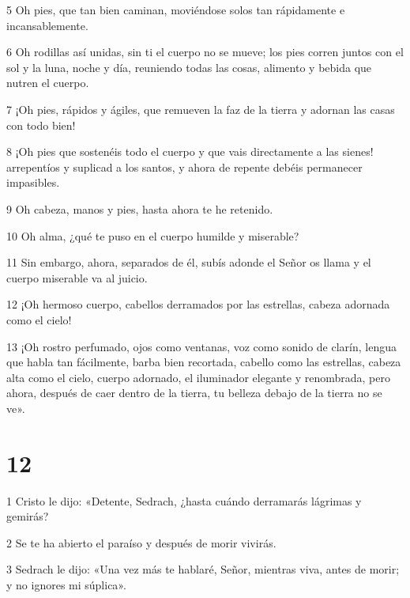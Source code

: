 \par 5 Oh pies, que tan bien caminan, moviéndose solos tan rápidamente e incansablemente.

\par 6 Oh rodillas así unidas, sin ti el cuerpo no se mueve; los pies corren juntos con el sol y la luna, noche y día, reuniendo todas las cosas, alimento y bebida que nutren el cuerpo.

\par 7 ¡Oh pies, rápidos y ágiles, que remueven la faz de la tierra y adornan las casas con todo bien!

\par 8 ¡Oh pies que sostenéis todo el cuerpo y que vais directamente a las sienes! arrepentíos y suplicad a los santos, y ahora de repente debéis permanecer impasibles.

\par 9 Oh cabeza, manos y pies, hasta ahora te he retenido.

\par 10 Oh alma, ¿qué te puso en el cuerpo humilde y miserable?

\par 11 Sin embargo, ahora, separados de él, subís adonde el Señor os llama y el cuerpo miserable va al juicio.

\par 12 ¡Oh hermoso cuerpo, cabellos derramados por las estrellas, cabeza adornada como el cielo!

\par 13 ¡Oh rostro perfumado, ojos como ventanas, voz como sonido de clarín, lengua que habla tan fácilmente, barba bien recortada, cabello como las estrellas, cabeza alta como el cielo, cuerpo adornado, el iluminador elegante y renombrada, pero ahora, después de caer dentro de la tierra, tu belleza debajo de la tierra no se ve».

\chapter{12}

\par 1 Cristo le dijo: «Detente, Sedrach, ¿hasta cuándo derramarás lágrimas y gemirás?   

\par 2 Se te ha abierto el paraíso y después de morir vivirás.

\par 3 Sedrach le dijo: «Una vez más te hablaré, Señor, mientras viva, antes de morir; y no ignores mi súplica».

